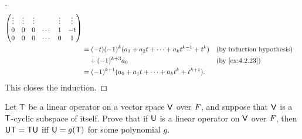 \begin{proof}[]
\begin{align*}
\begin{pmatrix}
                                            \vdots & \vdots & \vdots &        & \vdots & \vdots \\
                                            0      & 0      & 0      & \cdots & 1      & -t     \\
                                            0      & 0      & 0      & \cdots & 0      & 1
                                          \end{pmatrix}                                                \\
            & = (-t) (-1)^k (a_1 + a_2 t + \cdots + a_k t^{k - 1} + t^k)                               &  & \text{(by induction hypothesis)} \\
            & \quad + (-1)^{k + 3} a_0                                                                 &  & \by{ex:4.2.23}                   \\
            & = (-1)^{k + 1} (a_0 + a_1 t + \cdots + a_k t^k + t^{k + 1}).
  \end{align*}
  This closes the induction.
\end{proof}

\begin{ex}\label{ex:5.4.20}
  Let \(\mathsf{T}\) be a linear operator on a vector space \(\mathsf{V}\) over \(\mathit{F}\), and suppose that \(\mathsf{V}\) is a \(\mathsf{T}\)-cyclic subspace of itself.
  Prove that if \(\mathsf{U}\) is a linear operator on \(\mathsf{V}\) over \(\mathit{F}\), then \(\mathsf{U} \mathsf{T} = \mathsf{T} \mathsf{U}\) iff \(\mathsf{U} = g(\mathsf{T})\) for some polynomial \(g\).
\end{ex}


